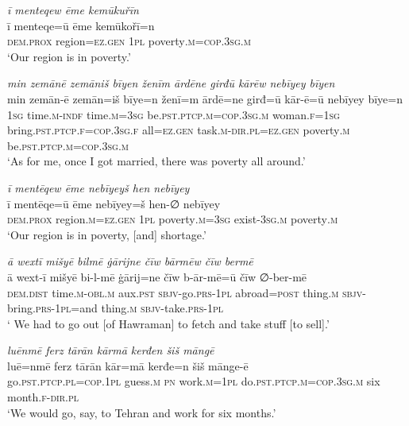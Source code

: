 \ea \label{ŽM.19}
\textit{ī menteqew ēme kemūkuřīn} \\ 
\gll ī menteqe=ū ēme kemūkořī=n \\ 
 \textsc{dem.prox} region\textsc{=ez.gen} \textsc{1pl} poverty\textsc{.m}\textsc{=cop}\textsc{.3sg}\textsc{.m} \\ 
\glt `Our region is in poverty.'
\z 
 
\ea \label{ŽM.20}
\textit{min zemānē zemāniš bīyen ženīm ārdēne girđū kārēw nebīyey bīyen} \\ 
\gll min zemān-ē zemān=iš bīye=n ženī=m ārdē=ne girđ=ū kār-ē=ū nebīyey bīye=n \\ 
 \textsc{1sg} time\textsc{.m}\textsc{-indf} time\textsc{.m}\textsc{=3sg} be\textsc{.pst}\textsc{.ptcp}\textsc{.m}\textsc{=cop}\textsc{.3sg}\textsc{.m} woman\textsc{.f}\textsc{=\textsc{1sg}} bring\textsc{.pst}\textsc{.ptcp}\textsc{.f}\textsc{=cop}\textsc{.3sg}\textsc{.f} all\textsc{=ez.gen} task\textsc{.m}\textsc{-dir}\textsc{.pl}\textsc{=ez.gen} poverty\textsc{.m} be\textsc{.pst}\textsc{.ptcp}\textsc{.m}\textsc{=cop}\textsc{.3sg}\textsc{.m} \\ 
\glt `As for me, once I got married, there was poverty all around.'
\z 
 
\ea \label{ŽM.21}
\textit{ī mentēqew ēme nebīyeyš hen nebīyey} \\ 
\gll ī mentēqe=ū ēme nebīyey=š hen-∅ nebīyey \\ 
 \textsc{dem.prox} region\textsc{.m}\textsc{=ez.gen} \textsc{1pl} poverty\textsc{.m}\textsc{=3sg} exist\textsc{-3sg}\textsc{.m} poverty\textsc{.m} \\ 
\glt `Our region is in poverty, [and] shortage.'
\z 
 
\ea \label{ŽM.22}
\textit{ā wextī mišyē bilmē ġārijne čīw bārmēw čīw bermē} \\ 
\gll ā wext-ī mišyē bi-l-mē ġārij=ne čīw b-ār-mē=ū čīw ∅-ber-mē \\ 
 \textsc{dem.dist} time\textsc{.m}\textsc{-obl}\textsc{.m} aux\textsc{.pst} \textsc{sbjv-}go\textsc{.prs}\textsc{-\textsc{1pl}} abroad\textsc{=\textsc{post}} thing\textsc{.m} \textsc{sbjv-}bring\textsc{.prs}\textsc{-\textsc{1pl}}=and thing\textsc{.m} \textsc{sbjv-}take\textsc{.prs}\textsc{-\textsc{1pl}} \\ 
\glt ` We had to go out [of Hawraman] to fetch and take stuff [to sell].'
\z 
 
\ea \label{ŽM.23}
\textit{luēnmē ferz tārān kārmā kerđen šiš māngē} \\ 
\gll luē=nmē ferz tārān kār=mā kerđe=n šiš mānge-ē \\ 
 go\textsc{.pst}\textsc{.ptcp}\textsc{.pl}\textsc{=cop}\textsc{.\textsc{1pl}} guess\textsc{.m} \textsc{pn} work\textsc{.m}\textsc{=\textsc{1pl}} do\textsc{.pst}\textsc{.ptcp}\textsc{.m}\textsc{=cop}\textsc{.3sg}\textsc{.m} six month\textsc{.f}\textsc{-dir}\textsc{.pl} \\ 
\glt `We would go, say, to Tehran and work for six months.'
\z 
 
